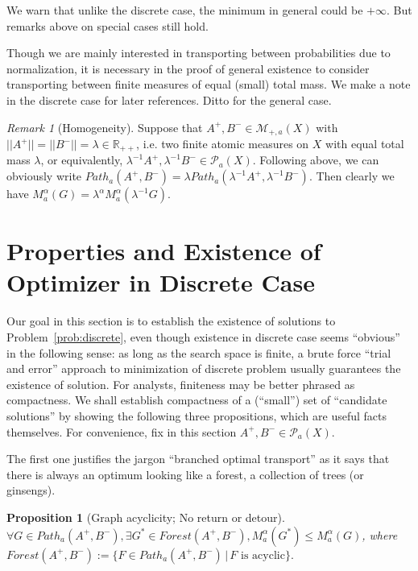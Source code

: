 \documentclass[fleqn]{article}
\newtheorem{prop}[thm]{Proposition}
\theoremstyle{definition}
\theoremstyle{remark}
\newtheorem{rem}[thm]{Remark}
\renewcommand{\P}{\mathcal{P}} %
\begin{document}
\par
We warn that unlike the discrete case, the minimum in general could be $+\infty$. But remarks above on special cases still hold.

\par
Though we are mainly interested in transporting between probabilities due to normalization, it is necessary in the proof of general existence to consider transporting between finite measures of equal (small) total mass. We make a note in the discrete case for later references. Ditto for the general case.
\begin{rem}[Homogeneity]\label{rem:scale}
Suppose that $A^+,B^- \in\mathcal{M}_{+,a}(X)$ with $||A^+|| = ||B^-|| = \lambda \in \mathbb{R}_{++}$, i.e. two finite atomic measures on $X$ with equal total mass $\lambda$, or equivalently, $\lambda^{-1}A^+,\lambda^{-1}B^- \in\P_a(X)$. Following above, we can obviously write $Path_a(A^+,B^-)=\lambda Path_a(\lambda^{-1}A^+,\lambda^{-1}B^-)$. Then clearly we have $M_a^\alpha(G)=\lambda^{\alpha} M_a^\alpha(\lambda^{-1}G)$.
\end{rem}

\section{Properties and Existence of Optimizer in Discrete Case} \label{sec:discrete}
Our goal in this section is to establish the existence of solutions to Problem~\ref{prob:discrete}, even though existence in discrete case seems ``obvious'' in the following sense: as long as the search space is finite, a brute force ``trial and error'' approach to minimization of discrete problem usually guarantees the existence of solution. For analysts, finiteness may be better phrased as compactness. We shall establish compactness of a (``small'') set of ``candidate solutions'' by showing the following three propositions, which are useful facts themselves. For convenience, fix in this section $A^+, B^- \in\P_a(X)$.

\par
The first one justifies the jargon ``branched optimal transport'' as it says that there is always an optimum looking like a forest, a collection of trees (or ginsengs).

\begin{prop}[Graph acyclicity; No return or detour]
$\forall G\in Path_a(A^+, B^-), \exists G^*\in Forest(A^+, B^-), M_a^\alpha(G^*) \le M_a^\alpha(G)$, where $Forest(A^+, B^-):=\{F\in Path_a(A^+, B^-) \,|\, F \textrm{ is acyclic}\}.$
\end{prop}
\end{document}
